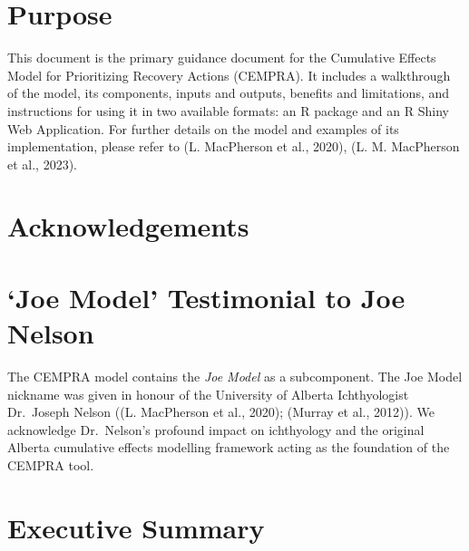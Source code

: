 \documentclass[
  letterpaper,
  DIV=11,
  numbers=noendperiod]{scrreprt}
\begin{document}
\section*{Purpose}\label{purpose}


This document is the primary guidance document for the Cumulative
Effects Model for Prioritizing Recovery Actions (CEMPRA). It includes a
walkthrough of the model, its components, inputs and outputs, benefits
and limitations, and instructions for using it in two available formats:
an R package and an R Shiny Web Application. For further details on the
model and examples of its implementation, please refer to (L. MacPherson
et al., 2020), (L. M. MacPherson et al., 2023).

\section*{Acknowledgements}\label{acknowledgements}


\section*{`Joe Model' Testimonial to Joe
Nelson}\label{joe-model-testimonial-to-joe-nelson}


The CEMPRA model contains the \emph{Joe Model} as a subcomponent. The
Joe Model nickname was given in honour of the University of Alberta
Ichthyologist Dr.~Joseph Nelson ((L. MacPherson et al., 2020); (Murray
et al., 2012)). We acknowledge Dr.~Nelson's profound impact on
ichthyology and the original Alberta cumulative effects modelling
framework acting as the foundation of the CEMPRA tool.

\section*{Executive Summary}\label{executive-summary}

\end{document}
